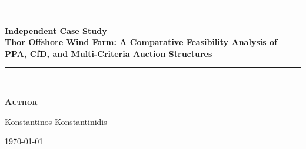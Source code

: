 \begin{titlepage}
	\begin{center}

	\vspace*{2.5cm}

	\rule{\linewidth}{0.5mm}\\[0.4cm]

	{\Large\bfseries Independent Case Study \\

	\vspace{0.3cm}
	Thor Offshore Wind Farm: A Comparative Feasibility Analysis of PPA, CfD, and Multi-Criteria Auction Structures}\\[0.2cm]
	\rule{\linewidth}{0.5mm}\\

	\vspace{1.5cm}

	\textsc{\textbf{Author}}\\
	\vspace{.5cm}

	Konstantinos Konstantinidis \\

	\vspace{2cm}

	\today \\ [3cm]

	\end{center}
\end{titlepage}
